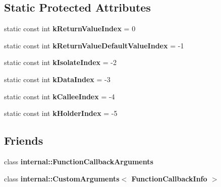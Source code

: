 \subsection*{Static Protected Attributes}
\begin{DoxyCompactItemize}
\item 
\hypertarget{classv8_1_1_function_callback_info_abb339e201184ebe2502a1202d54201ca}{}static const int {\bfseries k\+Return\+Value\+Index} = 0\label{classv8_1_1_function_callback_info_abb339e201184ebe2502a1202d54201ca}

\item 
\hypertarget{classv8_1_1_function_callback_info_a0b32b5613fe2f0cd139d9dffc0916d09}{}static const int {\bfseries k\+Return\+Value\+Default\+Value\+Index} = -\/1\label{classv8_1_1_function_callback_info_a0b32b5613fe2f0cd139d9dffc0916d09}

\item 
\hypertarget{classv8_1_1_function_callback_info_a0e2fbe5a323276263c848ea8050a34eb}{}static const int {\bfseries k\+Isolate\+Index} = -\/2\label{classv8_1_1_function_callback_info_a0e2fbe5a323276263c848ea8050a34eb}

\item 
\hypertarget{classv8_1_1_function_callback_info_a152c34c5b2f8c55d04d6d541bf8a4544}{}static const int {\bfseries k\+Data\+Index} = -\/3\label{classv8_1_1_function_callback_info_a152c34c5b2f8c55d04d6d541bf8a4544}

\item 
\hypertarget{classv8_1_1_function_callback_info_a08a4ef2004bfaa468df347d357849ca6}{}static const int {\bfseries k\+Callee\+Index} = -\/4\label{classv8_1_1_function_callback_info_a08a4ef2004bfaa468df347d357849ca6}

\item 
\hypertarget{classv8_1_1_function_callback_info_a073824921daf8600fb9c00c50ee8ef0c}{}static const int {\bfseries k\+Holder\+Index} = -\/5\label{classv8_1_1_function_callback_info_a073824921daf8600fb9c00c50ee8ef0c}

\end{DoxyCompactItemize}
\subsection*{Friends}
\begin{DoxyCompactItemize}
\item 
\hypertarget{classv8_1_1_function_callback_info_aac7268b20857fd75b69b86ded46d0f34}{}class {\bfseries internal\+::\+Function\+Callback\+Arguments}\label{classv8_1_1_function_callback_info_aac7268b20857fd75b69b86ded46d0f34}

\item 
\hypertarget{classv8_1_1_function_callback_info_a02d869d89b14ddd1717429c2106f955a}{}class {\bfseries internal\+::\+Custom\+Arguments$<$ Function\+Callback\+Info $>$}\label{classv8_1_1_function_callback_info_a02d869d89b14ddd1717429c2106f955a}

\end{DoxyCompactItemize}


